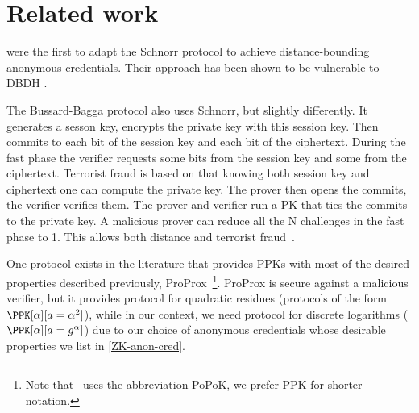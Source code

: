 \section{Related work}%
\label{related-work}


\textcite{DistanceBounding} were the first to adapt the Schnorr
protocol to achieve distance-bounding anonymous credentials. Their
approach has been shown to be vulnerable to \ac{DBDH} \cite{TamarinDB}.

  The Bussard-Bagga protocol also uses Schnorr, but slightly
  differently. It generates a sesson key, encrypts the private key
  with this session key. Then commits to each bit of the session key
  and each bit of the ciphertext. During the fast phase the verifier requests some bits from the session key and some from the ciphertext. Terrorist fraud is based on that knowing both session key and ciphertext one can compute the private key.
The prover then opens the commits, the verifier verifies them.
The prover and verifier run a PK that ties the commits to the private key.
A malicious prover can reduce all the N challenges in the fast phase
to 1. This allows both distance and terrorist
fraud~\cite{Bussard-Bagga-attack}.

One protocol exists in the literature that provides \acp{PPK} with most of the desired properties described previously, ProProx~\cite{ProProx}\footnote{Note that~\cite{ProProx} uses the abbreviation PoPoK, we prefer \acs{PPK} for shorter notation.}.
ProProx is secure against a malicious verifier, but it provides  protocol for quadratic residues (\ie protocols of the form \(\PPK[\alpha][a = 
  \alpha^2]\)), while in our context, we need  protocol for discrete logarithms (\ie \(\PPK[\alpha][a = g^\alpha]\)) due to our choice of anonymous credentials whose desirable properties we list in \cref{ZK-anon-cred}.%



